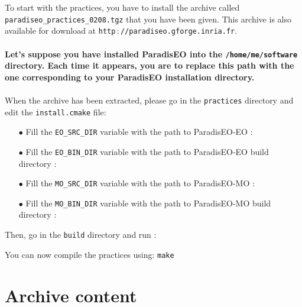 \documentclass[a4paper]{article}
\begin{document}
    To start with the practices, you have to install the archive
    called {\tt paradiseo\_practices\_0208.tgz} that you have been
    given. This archive is also available for download at
    {\tt http$\,:$//paradiseo.gforge.inria.fr}.\\\\
    \textbf{ Let's suppose you have installed ParadisEO
    into the {\tt /home/me/software} directory. Each time
    it appears, you are to replace this path with the one
    corresponding to your ParadisEO installation directory.
    }
    \\\\When the archive has been extracted, please go in the
    {\tt practices} directory and edit the {\tt install.cmake}
    file:

    \begin{itemize}
       \item[$\bullet$] Fill the {\tt EO\_SRC\_DIR} variable with the path to ParadisEO-EO :

          \hspace{1cm}{\tt /home/me/software/ParadisEO/paradiseo-eo}
       \item[$\bullet$] Fill the {\tt EO\_BIN\_DIR} variable with the path to
       ParadisEO-EO build directory :

          \hspace{1cm}{\tt /home/me/software/ParadisEO/paradiseo-eo/build}
       \item[$\bullet$] Fill the {\tt MO\_SRC\_DIR} variable with the path to ParadisEO-MO :

          \hspace{1cm}{\tt /home/me/software/ParadisEO/paradiseo-mo}
       \item[$\bullet$] Fill the {\tt MO\_BIN\_DIR} variable with the path to
       ParadisEO-MO build directory :

          \hspace{1cm}{\tt /home/me/software/ParadisEO/paradiseo-mo/build}
    \end{itemize}

    \medskip
    Then, go in the {\tt build} directory and run :

    \hspace{1cm}{\tt cmake ../}

    \medskip
    You can now compile the practices using: {\tt make}


\section{Archive content}
\end{document}
